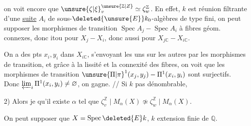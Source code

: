 
  on voit encore que $\unsure{\zeta|\xi}^{\unsure{\mathbb{Z}|Z}}_v\simeq\zeta_w^{\mathbb{Z}}$. En effet, $k$ est réunion filtrante d'une \uline{suite} $A_i$ de sous-$\deleted{\unsure{E}}k_0$-algèbres de type fini, on peut supposer les morphismes de transition $\operatorname{Spec} A_j\mathbin{-}\operatorname{Spec} A_i$  à fibres géom. connexes, donc itou pour $X_j\mathbin{-}X_i$, donc aussi pour $X_{j\mathbb{C}}\mathbin{-}X_{i\mathbb{C}}$.

On a des pts $x_i,y_i$ dans $X_{i\mathbb{C}}$, s'envoyant les uns sur les autres par les morphismes de transition, et grâce à la lissité et la connexité des fibres, on voit que les morphismes de transition $\unsure{\Pi|\pi}^{1}(x_j,y_j)\mathbin{-}\Pi^{1}(x_i,y_i)$ sont surjectifs. Donc $\varprojlim_i\Pi^{1}(x_i,y_i)\ne\varnothing$, on gagne. // Si $k$ pas dénombrable,

2)   Alors je   qu'il existe $\alpha$ tel que $\zeta^{\mathbb{Z}}_v\mid M_\alpha(X)\not\simeq\zeta^{\mathbb{Z}}_w\mid M_\alpha(X)$.


On peut supposer que $X=\operatorname{Spec}\deleted{E}k$, $k$ extension finie de $\mathbb{Q}$.

